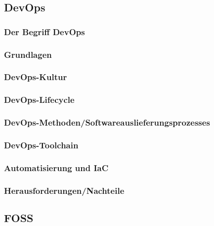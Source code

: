 \documentclass[12pt,titlepage]{article}
\begin{document}
\subsection{DevOps}


\subsubsection{Der Begriff DevOps}


\subsubsection{Grundlagen}


\subsubsection{DevOps-Kultur}


\subsubsection{DevOps-Lifecycle}


\subsubsection{DevOps-Methoden/Softwareauslieferungsprozesses}


\subsubsection{DevOps-Toolchain}


\subsubsection{Automatisierung und IaC}


\subsubsection{Herausforderungen/Nachteile}


\subsection{FOSS}

\end{document}
